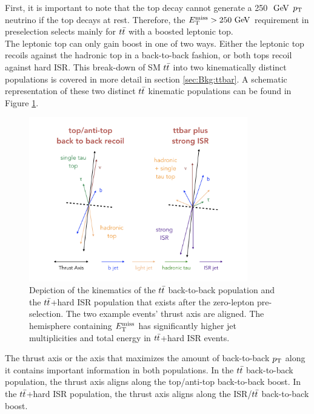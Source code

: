 \indent First, it is important to note that the top decay cannot generate a 250 $\gev$ $p_{\mathrm{T}}$ neutrino if the top decays at rest.  Therefore, the $\MET > 250 \gev$ requirement in preselection selects mainly for $\ttbar$ with a boosted leptonic top.   \\

\indent  The leptonic top can only gain boost in one of two ways.  Either the leptonic top recoils against the hadronic top in a back-to-back fashion, or both tops recoil against hard ISR.  This break-down of SM $\ttbar$ into two kinematically distinct populations is covered in more detail in section \ref{sec:Bkg:ttbar}.  A schematic representation of these two distinct $\ttbar$ kinematic populations can be found in Figure \ref{fig:ttbar:2pop}. \\

\begin{figure}[h!]
  \centering
	\includegraphics[width=0.85\textwidth]{./figures/strategy/ttbar_2pop.png}
	\caption[Schematic depiction of the kinematics of the $\ttbar$ back-to-back $\ttbar$ population and the $\ttbar$+hard ISR population that exists after the zero-lepton pre-selection.]{Depiction of the kinematics of the $\ttbar$ back-to-back population and the $\ttbar$+hard ISR population that exists after the zero-lepton pre-selection. The two example events' thrust axis are aligned.  The hemisphere containing $E_{\mathrm{T}}^{\mathrm{miss}}$ has significantly higher jet multiplicities and total energy in $\ttbar$+hard ISR events. }
\label{fig:ttbar:2pop}
\end{figure}

\indent The thrust axis or the axis that maximizes the amount of back-to-back $p_{\mathrm{T}}$ along it contains important information in both populations.  In the $\ttbar$ back-to-back population, the thrust axis aligns along the top/anti-top back-to-back boost.  In the $\ttbar$+hard ISR population, the thrust axis aligns along the ISR/$\ttbar$ back-to-back boost.  \\

